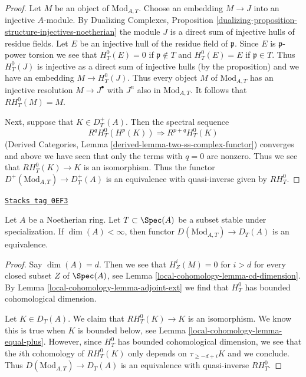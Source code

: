 \begin{proof}
Let $M$ be an object of $\text{Mod}_{A, T}$. Choose an embedding
$M \to J$ into an injective $A$-module. By
Dualizing Complexes, Proposition
\ref{dualizing-proposition-structure-injectives-noetherian}
the module $J$ is a direct sum of injective hulls of residue fields.
Let $E$ be an injective hull of the residue field of $\mathfrak p$.
Since $E$ is $\mathfrak p$-power torsion we see that
$H^0_T(E) = 0$ if $\mathfrak p \not \in T$ and
$H^0_T(E) = E$ if $\mathfrak p \in T$.
Thus $H^0_T(J)$ is injective as a direct sum of injective hulls
(by the proposition) and we have an embedding $M \to H^0_T(J)$.
Thus every object $M$ of $\text{Mod}_{A, T}$ has an injective resolution
$M \to J^\bullet$ with $J^n$ also in $\text{Mod}_{A, T}$. It follows
that $RH^0_T(M) = M$.

\medskip\noindent
Next, suppose that $K \in D_T^+(A)$. Then the spectral sequence
$$
R^qH^0_T(H^p(K)) \Rightarrow R^{p + q}H^0_T(K)
$$
(Derived Categories, Lemma \ref{derived-lemma-two-ss-complex-functor})
converges and above we have seen that only the terms with $q = 0$
are nonzero. Thus we see that $RH^0_T(K) \to K$ is an isomorphism.
Thus the functor $D^+(\text{Mod}_{A, T}) \to D^+_T(A)$
is an equivalence with quasi-inverse given by $RH^0_T$.
\end{proof}

\begin{lemma}
\label{local-cohomology-lemma-equal-full}
\href{https://stacks.math.columbia.edu/tag/0EF3}{\texttt{Stacks tag 0EF3}}

Let $A$ be a Noetherian ring. Let $T \subset \Spec(A)$ be a subset stable
under specialization. If $\dim(A) < \infty$, then functor
$D(\text{Mod}_{A, T}) \to D_T(A)$ is an equivalence.
\end{lemma}

\begin{proof}
Say $\dim(A) = d$. Then we see that $H^i_Z(M) = 0$ for $i > d$
for every closed subset $Z$ of $\Spec(A)$, see
Lemma \ref{local-cohomology-lemma-cd-dimension}.
By Lemma \ref{local-cohomology-lemma-adjoint-ext} we find that $H^0_T$ has bounded
cohomological dimension.

\medskip\noindent
Let $K \in D_T(A)$. We claim that $RH^0_T(K) \to K$ is an
isomorphism. We know this is true when $K$ is bounded below, see
Lemma \ref{local-cohomology-lemma-equal-plus}. However, since $H^0_T$ has bounded
cohomological dimension, we see that the $i$th cohomology of
$RH_T^0(K)$ only depends on $\tau_{\geq -d + i}K$ and we conclude.
Thus $D(\text{Mod}_{A, T}) \to D_T(A)$ is an equivalence with
quasi-inverse $RH^0_T$.
\end{proof}

